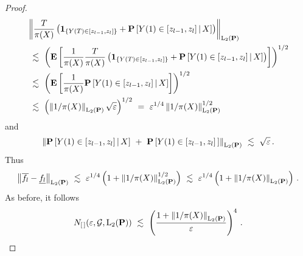 \begin{proof}
  \begin{align*}
    &
    \norm{
      \frac{T}{\pi(X)}
      \left( 
      \mathbf{1}_{
      \left\{ 
      Y(T)\in [z_{l-1},z_l] 
    \right\}
    }
      +
      \P
      \left[ 
      Y(1)\in [z_{l-1},z_l] 
      \,
      |
      \,
      X
      \right]
      \right)
    }_{\mathrm{L}_2(\P)}
    \\
    &
    \
    \lesssim
    \
    \left( 
      \E
      \left[ 
        \frac{1}{\pi(X)}
        \frac{T}{\pi(X)}
      \left( 
      \mathbf{1}_{
      \left\{ 
      Y(T)\in [z_{l-1},z_l] 
    \right\}
    }
      +
      \P
      \left[ 
      Y(1)\in [z_{l-1},z_l] 
      \,
      |
      \,
      X
      \right]
      \right)
      \right]
    \right)
    ^{1/2}
    \\
    &
    \
    \lesssim
    \
    \left( 
      \E
      \left[ 
        \frac{1}{\pi(X)}
      \P
      \left[ 
      Y(1)\in [z_{l-1},z_l] 
      \,
      |
      \,
      X
      \right]
      \right]
    \right)
    ^{1/2}
    \\
    &
    \ 
    \lesssim
    \ 
    \left( 
      \norm{1/\pi(X)}_{\mathrm{L}_2(\P)}
      \sqrt{\varepsilon}
    \right)
    ^{1/2}
    \ 
    =
    \ 
    \varepsilon^{1/4}
    \norm{1/\pi(X)}_{\mathrm{L}_2(\P)}^{1/2}
  \end{align*}
  and
  \begin{align*}
     \norm{
      \P
      \left[ 
      Y(1)\in [z_{l-1},z_l] 
      \,
      |
      \,
      X
      \right]
      \ 
     + 
      \ 
      \P
      \left[ 
      Y(1)\in [z_{l-1},z_l] \,
      \right]
    }_{\mathrm{L}_2(\P)}
    \ 
    \lesssim
    \ 
    \sqrt{\varepsilon}
    \,.
  \end{align*}
  Thus
  \begin{gather}
  \norm{
  \overline{f_l}
-
  \underline{f_l}
}_
{\mathrm{L}_2(\P)}
\ 
\lesssim
\ 
\varepsilon^{1/4}
\left( 
  1
  +
    \norm{1/\pi(X)}_{\mathrm{L}_2(\P)}^{1/2}
\right)
\ 
\lesssim
\ 
\varepsilon^{1/4}
\left( 
  1
  +
    \norm{1/\pi(X)}_{\mathrm{L}_2(\P)}
\right)
\,.
  \end{gather}
As before, it follows
\begin{gather}
    N_{[\,]}
    (
    \varepsilon
    ,
    \mathcal{G},\mathrm{L}_2(\P))
    \ 
    \lesssim
    \ 
    \left( 
    \frac{
      1+
    \norm{1/\pi(X)}_{\mathrm{L}_2(\P)}
    }
    {\varepsilon}
    \right)^4
    \,.
\end{gather}
\end{proof}

